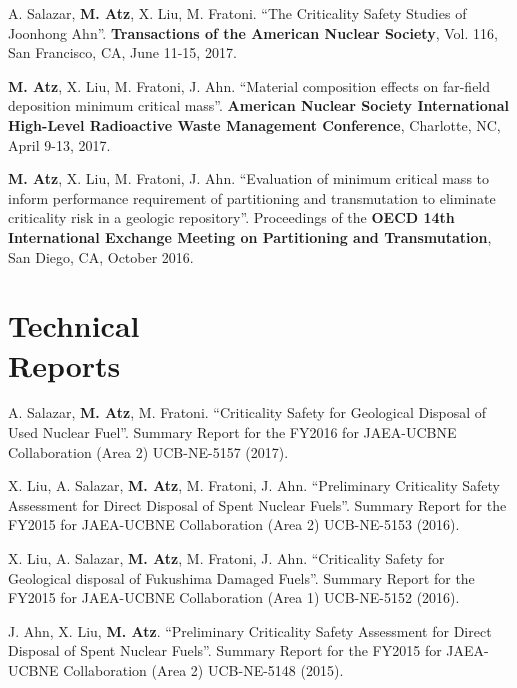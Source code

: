 \documentclass[margin,line]{resume}
\begin{document}
\begin{resume}
\begin{bibenum}
    \item A. Salazar, \textbf{M. Atz}, X. Liu, M. Fratoni. ``The Criticality Safety Studies of Joonhong Ahn''. \textbf{Transactions of the American Nuclear Society}, Vol. 116, San Francisco, CA, June 11-15, 2017.

    \item \textbf{M. Atz}, X. Liu, M. Fratoni, J. Ahn. ``Material composition effects on far-field deposition minimum critical mass''. \textbf{American Nuclear Society International High-Level Radioactive Waste Management Conference}, Charlotte, NC, April 9-13, 2017.

    \item \textbf{M. Atz}, X. Liu, M. Fratoni, J. Ahn. ``Evaluation of minimum critical mass to inform performance requirement of partitioning and transmutation to eliminate criticality risk in a geologic repository''. Proceedings of the \textbf{OECD 14th International Exchange Meeting on Partitioning and Transmutation}, San Diego, CA, October 2016.

\end{bibenum}


\section{\mysidestyle Technical\\Reports}
\begin{bibenum}

    \item A. Salazar, \textbf{M. Atz}, M. Fratoni. ``Criticality Safety for Geological Disposal of Used Nuclear Fuel''. Summary Report for the FY2016 for JAEA-UCBNE Collaboration (Area 2) UCB-NE-5157 (2017).
    
    \item X. Liu, A. Salazar, \textbf{M. Atz}, M. Fratoni, J. Ahn. ``Preliminary Criticality Safety Assessment for Direct Disposal of Spent Nuclear
	Fuels''. Summary Report for the FY2015 for JAEA-UCBNE Collaboration (Area 2) UCB-NE-5153 (2016).
	
	\item X. Liu, A. Salazar, \textbf{M. Atz}, M. Fratoni, J. Ahn. ``Criticality Safety for Geological disposal of Fukushima Damaged Fuels''. Summary Report for the FY2015 for JAEA-UCBNE Collaboration (Area 1) UCB-NE-5152 (2016).

    \item J. Ahn, X. Liu, \textbf{M. Atz}. ``Preliminary Criticality Safety Assessment for Direct Disposal of Spent Nuclear Fuels''. Summary Report for the FY2015 for JAEA-UCBNE Collaboration (Area 2) UCB-NE-5148 (2015).


\end{bibenum}
\end{resume}
\end{document}
